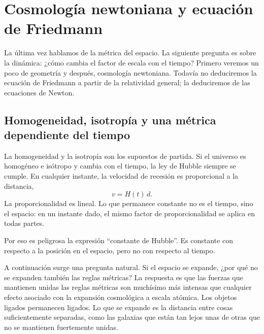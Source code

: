 \chapter{Cosmología newtoniana y ecuación de Friedmann}

La última vez hablamos de la métrica del espacio. La siguiente pregunta es sobre la dinámica: ¿cómo cambia el factor de escala con el tiempo? Primero veremos un poco de geometría y después, cosmología newtoniana. Todavía no deduciremos la ecuación de Friedmann a partir de la relatividad general; la deduciremos de las ecuaciones de Newton.

\section{Homogeneidad, isotropía y una métrica dependiente del tiempo}

La homogeneidad y la isotropía son los supuestos de partida. Si el universo es homogéneo e isótropo y cambia con el tiempo, la ley de Hubble siempre se cumple. En cualquier instante, la velocidad de recesión es proporcional a la distancia,
\begin{equation}
v = H(t)\,d.
\end{equation}
La proporcionalidad es lineal. Lo que permanece constante no es el tiempo, sino el espacio: en un instante dado, el mismo factor de proporcionalidad se aplica en todas partes.

\begin{classroomqa}
\end{classroomqa}

Por eso es peligrosa la expresión ``constante de Hubble''. Es constante con respecto a la posición en el espacio, pero no con respecto al tiempo.

A continuación surge una pregunta natural. Si el espacio se expande, ¿por qué no se expanden también las reglas métricas? La respuesta es que las fuerzas que mantienen unidas las reglas métricas son muchísimo más intensas que cualquier efecto asociado con la expansión cosmológica a escala atómica. Los objetos ligados permanecen ligados. Lo que se expande es la distancia entre cosas suficientemente separadas, como las galaxias que están tan lejos unas de otras que no se mantienen fuertemente unidas.

